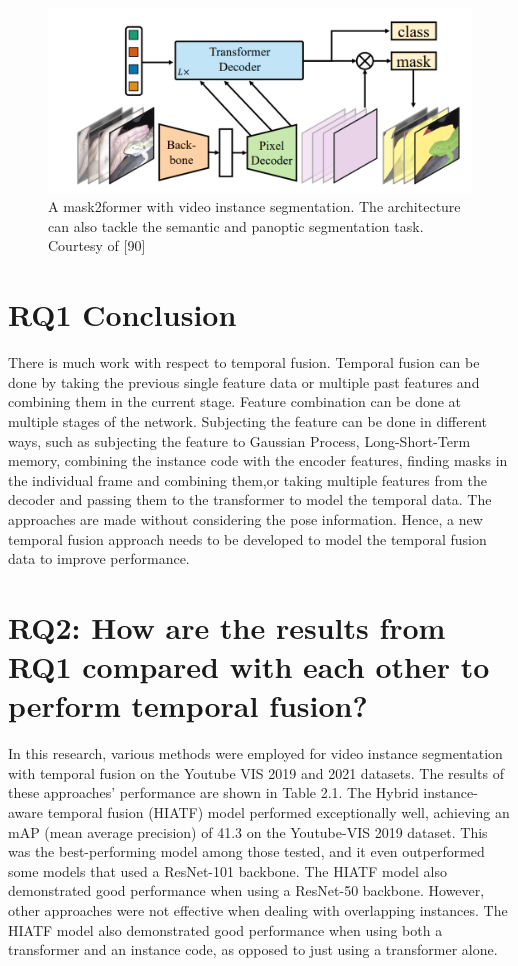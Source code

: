     \begin{figure}
    	\centering
    	\includegraphics[width=13cm]{images/mask2former.png}
    	\caption{ A mask2former with video instance segmentation. The architecture can also tackle the semantic and panoptic segmentation task. Courtesy of [90]}
    	\label{fig:mask2former}
    \end{figure}	
    
    \section{RQ1 Conclusion}
    
    There is much work with respect to temporal fusion. Temporal fusion can be done by taking the previous single feature data or multiple past features and combining them in the current stage. Feature combination can be done at multiple stages of the network. Subjecting the feature can be done in different ways, such as subjecting the feature to Gaussian Process, Long-Short-Term memory, combining the instance code with the encoder features, finding masks in the individual frame and combining them,or taking multiple features from the decoder and passing them to the transformer to model the temporal data. The approaches are made without considering the pose information. Hence, a new temporal fusion approach needs to be developed to model the temporal fusion data to improve performance. 
    
    \section{RQ2: How are the results from RQ1 compared with each other to perform temporal fusion?}
    
	In this research, various methods were employed for video instance segmentation with temporal fusion on the Youtube VIS 2019 and 2021 datasets. The results of these approaches' performance are shown in Table 2.1. The Hybrid instance-aware temporal fusion (HIATF) model performed exceptionally well, achieving an mAP (mean average precision) of 41.3 on the Youtube-VIS 2019 dataset. This was the best-performing model among those tested, and it even outperformed some models that used a ResNet-101 backbone. The HIATF model also demonstrated good performance when using a ResNet-50 backbone. However, other approaches were not effective when dealing with overlapping instances. The HIATF model also demonstrated good performance when using both a transformer and an instance code, as opposed to just using a transformer alone.
	

